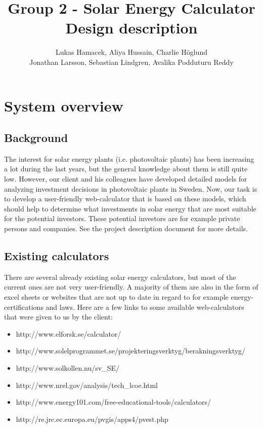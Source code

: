 \documentclass[]{article}
\title{Group 2 - Solar Energy Calculator\\Design description}
\author{  Lukas Hamacek, Aliya Hussain, Charlie H{\"o}glund 
		\\Jonathan Larsson, Sebastian Lindgren, Avalika Podduturu Reddy}
\begin{document}
\maketitle
\pagebreak
\tableofcontents
\pagebreak
\listoffigures
\pagebreak

\section{System overview}
\subsection{Background}
The interest for solar energy plants (i.e. photovoltaic plants) has been increasing
a lot during the last years, but the general knowledge about them is still quite
low. However, our client and his colleagues have developed detailed models for
analyzing investment decisions in photovoltaic plants in Sweden. Now, our task
is to develop a user-friendly web-calculator that is based on these models, which
should help to determine what investments in solar energy that are most suitable
for the potential investors. These potential investors are for example private persons and companies. See the project description document for more details.

\subsection{Existing calculators}
There are several already existing solar energy calculators, but most of the current ones are not very user-friendly. A majority of them are also in the form of excel sheets or websites that are not up to date in regard to for example energy-certifications and laws. Here are a few links to some available web-calculators that were given to us by the client:

\begin{itemize}
	\item http://www.elforsk.se/calculator/
	\item http://www.solelprogrammet.se/projekteringsverktyg/berakningsverktyg/
	\item http://www.solkollen.nu/sv\_SE/
	\item http://www.nrel.gov/analysis/tech\_lcoe.html
	\item http://www.energy101.com/free-educational-tools/calculators/
	\item http://re.jrc.ec.europa.eu/pvgis/apps4/pvest.php
\end{itemize}
\end{document}
